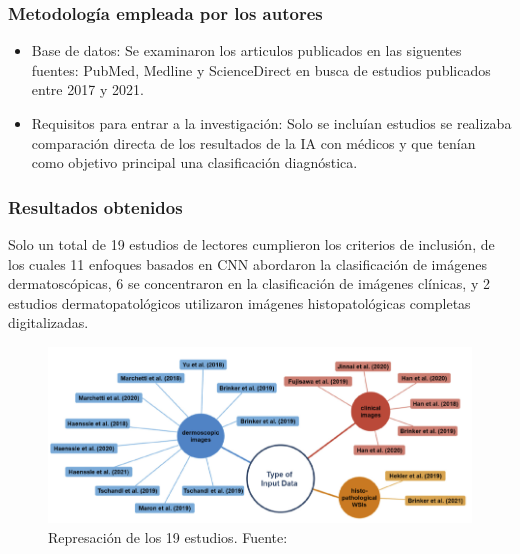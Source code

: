 \subsubsection{Metodología empleada por los autores}
\newcommand{\TISCone}{Base de datos: Se examinaron los articulos publicados en las siguentes fuentes: PubMed, Medline y ScienceDirect en busca de estudios publicados entre 2017 y 2021.
	
}
\newcommand{\TISCtwo}{Requisitos para entrar a la investigación: Solo se incluían estudios se realizaba comparación directa de los resultados de la IA con médicos y que tenían como objetivo principal una clasificación diagnóstica.
}


\begin{itemize}
	\item \TISCone
	\item \TISCtwo
	
\end{itemize}

\subsubsection{Resultados obtenidos}
Solo un total de 19 estudios de lectores cumplieron los criterios de inclusión, de los cuales 11 enfoques basados en CNN abordaron la clasificación de imágenes dermatoscópicas, 6 se concentraron en la clasificación de imágenes clínicas, y 2 estudios dermatopatológicos utilizaron imágenes histopatológicas completas digitalizadas.



\begin{figure}[h]
	\begin{center}
		\includegraphics[width=1\textwidth]{2/figuras/Skin_cancer_classification _imagen_01.png}
		\caption{Represación de los 19 estudios. Fuente: \cite{haggenmuller2021skin}}
		\label{1:fig}
	\end{center}
\end{figure}





